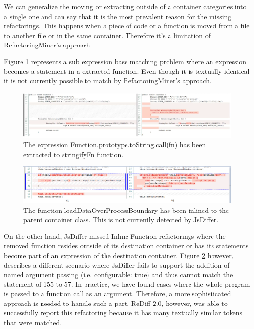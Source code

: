 \documentclass[letterpaper,12pt,onecolumn,final]{report}
\begin{document}
We can generalize the moving or extracting outside of a container categories into a single one and can say  that it is the most prevalent reason for the missing refactorings. This happens when a piece of code or a function is moved from a file to another file or in the same container. Therefore it's a limitation of RefactoringMiner's approach.

Figure \ref{fig:extractStringify} represents a sub expression base matching problem where an expression becomes a statement in a extracted function. Even though it is textually identical it is not currently possible to match by RefactoringMiner's approach.

\begin{figure}
\includegraphics[width=\textwidth,height=\textheight,keepaspectratio]{images/stringify.PNG}
  \caption{The expression Function.prototype.toString.call(fn) has been extracted to stringifyFn function.}
   \label{fig:extractStringify}
\end{figure} 

\begin{figure}
\includegraphics[width=\textwidth,keepaspectratio]{images/MissingInline.PNG}
  \caption{The function loadDataOverProcessBoundary has been inlined to the parent container class. This is not currently detected by JsDiffer.}
   \label{fig:inlineFunction}
\end{figure} 

On the other hand, JsDiffer missed Inline Function refactorings where the removed function resides outside of its destination container or has its statements become part of an expression of the destination container. Figure \ref{fig:inlineFunction} however, describes a different scenario where JsDiffer fails to support the addition of named argument passing (i.e. configurable: true) and thus cannot match the statement of 155 to 57. In practice, we have found cases where the whole program is passed to a function call as an argument. Therefore, a more sophisticated approach is needed to handle such a part. ReDiff 2.0, however, was able to successfully report this refactoring because it has many textually similar tokens that were matched.
\end{document}
